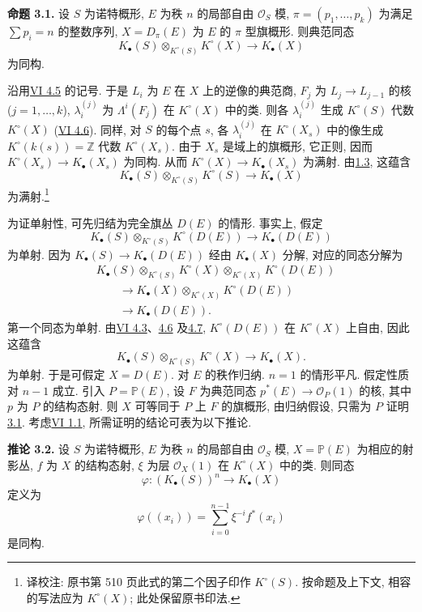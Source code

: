 \textbf{命题 3.1.} 设 $S$ 为诺特概形, $E$ 为秩 $n$ 的局部自由 $\mathcal O_S$ 模, $\pi=(p_1,\ldots,p_k)$ 为满足 $\sum p_i=n$ 的整数序列, $X=D_\pi(E)$ 为 $E$ 的 $\pi$ 型旗概形. 则典范同态
\[
 K_\bullet(S)\otimes_{K^\circ(S)}K^\circ(X)\longrightarrow K_\bullet(X)
\]
为同构.

沿用\hyperlink{sga6.e06.sec.4.5}{VI 4.5} 的记号. 于是 $L_i$ 为 $E$ 在 $X$ 上的逆像的典范商, $F_j$ 为 $L_j\to L_{j-1}$ 的核 ($j=1,\ldots,k$), $\lambda_i^{(j)}$ 为 $\Lambda^i(F_j)$ 在 $K^\circ(X)$ 中的类. 则各 $\lambda_i^{(j)}$ 生成 $K^\circ(S)$ 代数 $K^\circ(X)$ (\hyperlink{sga6.e06.thm.4-6}{VI 4.6}). 同样, 对 $S$ 的每个点 $s$, 各 $\lambda_i^{(j)}$ 在 $K^\circ(X_s)$ 中的像生成 $K^\circ(k(s))=\mathbb Z$ 代数 $K^\circ(X_s)$. 由于 $X_s$ 是域上的旗概形, 它正则, 因而 $K^\circ(X_s)\to K_\bullet(X_s)$ 为同构. 从而 $K^\circ(X)\to K_\bullet(X_s)$ 为满射. 由\hyperlink{sga6.e09.cor.1-3}{1.3}, 这蕴含
\[
 K_\bullet(S)\otimes_{K^\circ(S)}K^\circ(S)\longrightarrow K_\bullet(X)
\]
为满射.\footnote{译校注: 原书第 510 页此式的第二个因子印作 $K^\circ(S)$. 按命题及上下文, 相容的写法应为 $K^\circ(X)$; 此处保留原书印法.}

为证单射性, 可先归结为完全旗丛 $D(E)$ 的情形. 事实上, 假定
\[
 K_\bullet(S)\otimes_{K^\circ(S)}K^\circ(D(E))\longrightarrow K_\bullet(D(E))
\]
为单射. 因为 $K_\bullet(S)\to K_\bullet(D(E))$ 经由 $K_\bullet(X)$ 分解, 对应的同态分解为
\[
\begin{aligned}
 &K_\bullet(S)\otimes_{K^\circ(S)}K^\circ(X)\otimes_{K^\circ(X)}K^\circ(D(E))\\
 &\qquad\longrightarrow K_\bullet(X)\otimes_{K^\circ(X)}K^\circ(D(E))\\
 &\qquad\longrightarrow K_\bullet(D(E)).
\end{aligned}
\]
第一个同态为单射. 由\hyperlink{sga6.e06.lem.4-3}{VI 4.3}、\hyperlink{sga6.e06.thm.4-6}{4.6} 及\hyperlink{sga6.e06.cor.4-7}{4.7}, $K^\circ(D(E))$ 在 $K^\circ(X)$ 上自由, 因此这蕴含
\[
 K_\bullet(S)\otimes_{K^\circ(S)}K^\circ(X)\to K_\bullet(X).
\]
为单射. 于是可假定 $X=D(E)$. 对 $E$ 的秩作归纳. $n=1$ 的情形平凡. 假定性质对 $n-1$ 成立. 引入 $P=\mathbb P(E)$, 设 $F$ 为典范同态 $p^*(E)\to\mathcal O_P(1)$ 的核, 其中 $p$ 为 $P$ 的结构态射. 则 $X$ 可等同于 $P$ 上 $F$ 的旗概形, 由归纳假设, 只需为 $P$ 证明\hyperlink{sga6.e09.prop.3-1}{3.1}. 考虑\hyperlink{sga6.e06.thm.1-1}{VI 1.1}, 所需证明的结论可表为以下推论.

\textbf{推论 3.2.} 设 $S$ 为诺特概形, $E$ 为秩 $n$ 的局部自由 $\mathcal O_S$ 模, $X=\mathbb P(E)$ 为相应的射影丛, $f$ 为 $X$ 的结构态射, $\xi$ 为层 $\mathcal O_X(1)$ 在 $K^\circ(X)$ 中的类. 则同态
\[
 \varphi:(K_\bullet(S))^n\longrightarrow K_\bullet(X)
\]
定义为
\[
 \varphi((x_i))=\sum_{i=0}^{n-1}\xi^{-i}f^*(x_i)
\]
是同构.


